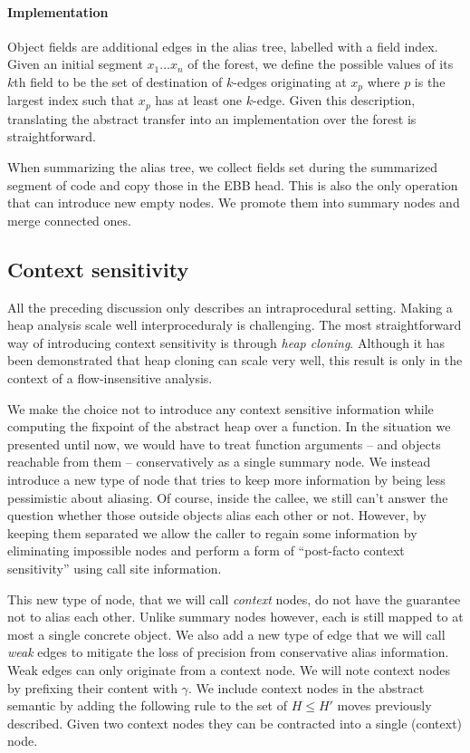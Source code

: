 \documentclass[11pt]{article}
\begin{document}
\paragraph{Implementation} Object fields are additional edges in the alias tree, labelled with a field index.
Given an initial segment $x_1\dots x_n$ of the forest, we define the possible values of its $k$th field to be the set of destination of $k$-edges originating at $x_p$ where $p$ is the largest index such that $x_p$ has at least one $k$-edge.
Given this description, translating the abstract transfer into an implementation over the forest is straightforward.

When summarizing the alias tree, we collect fields set during the summarized segment of code and copy those in the EBB head.
This is also the only operation that can introduce new empty nodes. We promote them into summary nodes and merge connected ones.

\subsection*{Context sensitivity}

All the preceding discussion only describes an intraprocedural setting.
Making a heap analysis scale well interproceduraly is challenging.
The most straightforward way of introducing context sensitivity is through \emph{heap cloning}.
Although it has been demonstrated that heap cloning can scale very well\cite{heapclone}, this result is only in the context of a flow-insensitive analysis.

We make the choice not to introduce any context sensitive information while computing the fixpoint of the abstract heap over a function.
In the situation we presented until now, we would have to treat function arguments -- and objects reachable from them -- conservatively as a single summary node.
We instead introduce a new type of node that tries to keep more information by being less pessimistic about aliasing.
Of course, inside the callee, we still can't answer the question whether those outside objects alias each other or not.
However, by keeping them separated we allow the caller to regain some information by eliminating impossible nodes and perform a form of ``post-facto context sensitivity'' using call site information.

This new type of node, that we will call \emph{context} nodes, do not have the guarantee not to alias each other.
Unlike summary nodes however, each is still mapped to at most a single concrete object.
We also add a new type of edge that we will call \emph{weak} edges to mitigate the loss of precision from conservative alias information.
Weak edges can only originate from a context node.
We will note context nodes by prefixing their content with $\gamma$.
We include context nodes in the abstract semantic by adding the following rule to the set of $H\leq H'$ moves previously described.
Given two context nodes they can be contracted into a single (context) node.
\end{document}
